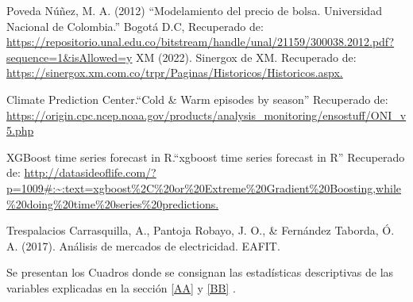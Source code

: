 \documentclass[conference, 10pt]{IEEEtran}
\begin{document}
\begin{thebibliography}{00}
 Poveda Núñez, M. A. (2012) “Modelamiento del precio de bolsa. Universidad Nacional de Colombia.” Bogotá D.C, Recuperado de: \url{https://repositorio.unal.edu.co/bitstream/handle/unal/21159/300038.2012.pdf?sequence=1&isAllowed=y}
 XM (2022). Sinergox de XM. Recuperado de: \url{ https://sinergox.xm.com.co/trpr/Paginas/Historicos/Historicos.aspx.} 

Climate Prediction Center.“Cold \& Warm episodes by season” Recuperado de: \url{https://origin.cpc.ncep.noaa.gov/products/analysis_monitoring/ensostuff/ONI_v5.php}

XGBoost time series forecast in R.“xgboost time series forecast in R” Recuperado de: \url{http://datasideoflife.com/?p=1009#:~:text=xgboost\%2C\%20or\%20Extreme\%20Gradient\%20Boosting,while\%20doing\%20time\%20series\%20predictions.}

Trespalacios Carrasquilla, A., Pantoja Robayo, J. O., \& Fernández Taborda, Ó. A. (2017). Análisis de mercados de electricidad. EAFIT.

\end{thebibliography}


Se presentan los Cuadros donde se consignan las estadísticas descriptivas de las variables explicadas en la sección \ref{AA} y \ref{BB} .\\ 
\end{document}
